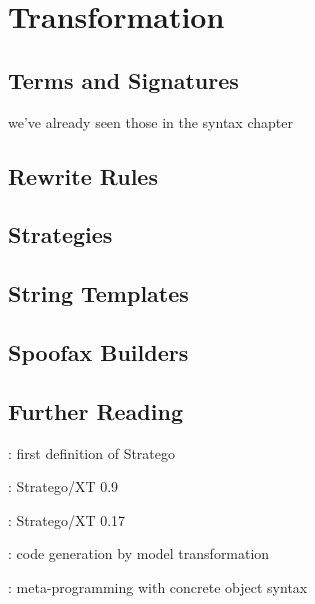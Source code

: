 \chapter{Transformation}

\section{Terms and Signatures}

we've already seen those in the syntax chapter

\section{Rewrite Rules}


\section{Strategies}


\section{String Templates}


\section{Spoofax Builders}






\section{Further Reading}

\cite{VisserBT98}: first definition of Stratego

\cite{Visser03}: Stratego/XT 0.9

\cite{BravenboerKVV08}: Stratego/XT 0.17

\cite{HemelKGV10}: code generation by model transformation


\cite{Visser02}: meta-programming with concrete object syntax
